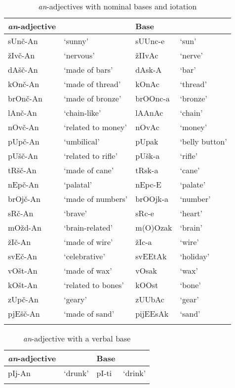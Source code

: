 \documentclass[output=paper]{langsci/langscibook}
\begin{document}
\begin{table}
\caption{\textit{an}-adjectives with nominal bases and iotation} 
\label{tabapp2}
\begin{tabular}{ l l l l}
\lsptoprule  
 \textit{an}-adjective &  & Base & 
\\ 
\hline
sUnč-An & `sunny' & sUUnc-e & `sun'\\
žIvč-An & `nervous' & žIIvAc & `nerve'\\
dAšč-An & `made of bars' & dAsk-A & `bar' \\
kOnč-An & `made of thread' & kOnAc & `thread' \\
brOnč-An & `made of bronze' & brOOnc-a & `bronze' \\
lAnč-An & `chain-like' & lAAnAc & `chain'\\
nOvč-An & `related to money' & nOvAc & `money'\\
pUpč-An & `umbilical' & pUpak & `belly button'\\
pUšč-An & `related to rifle' & pUšk-a & `rifle' \\ 
tRšč-An & `made of cane' & tRsk-a & `cane'\\
nEpč-An & `palatal' & nEpc-E & `palate'\\
brOjč-An & `made of numbers' & brOOjk-a & `number'\\
sRč-An & `brave' & sRc-e & `heart'\\
mOžd-An & `brain-related' & m(O)Ozak & `brain'\\
žIč-An & `made of wire' & žIc-a & `wire'\\
svEč-An & `celebrative' & svEEtAk & `holiday'\\
vOšt-An & `made of wax' & vOsak & `wax'\\
kOšt-An & `related to bones' & kOOst & `bone'\\
zUpč-An & `geary' & zUUbAc & `gear'\\
pjEšč-An & `made of sand' & pijEEsAk & `sand'\\
 \lspbottomrule
 \end{tabular}
\end{table} 

\begin{table}
\caption{\textit{an}-adjective with a verbal base}
\label{tabapp3}
 \begin{tabular}{ l l l l}
\lsptoprule  
\textit{an}-adjective &  & Base & \\ 
\hline
pIj-An & `drunk' & pI-ti & `drink' \\
 \lspbottomrule
 \end{tabular}
\end{table} 
\end{document}
